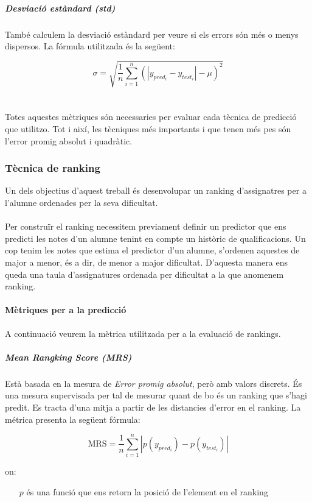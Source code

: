 \documentclass[12pt,a4paper,catalan]{article}
\begin{document}
\subparagraph{Desviació estàndard (std)}
També calculem la desviació estàndard per veure si els errors són més o menys dispersos. La fórmula utilitzada és la següent:

$$ \sigma = \sqrt{ \frac{1}{n} \sum_{i=1}^n (\left| y_{pred_i}-y_{test_i}\right| - \mu)^2 } $$
\\
\\
Totes aquestes mètriques són necessaries per evaluar cada tècnica de predicció que utilitzo. Tot i així, les tècniques més importants i que tenen més pes són l'error promig absolut i quadràtic.

\subsubsection{Tècnica de ranking}
Un dels objectius d'aquest treball és desenvolupar un ranking d'assignatres per a l'alumne ordenades per la seva dificultat. 
\\
\\
Per construïr el ranking necessitem previament definir un predictor que ens predicti les notes d'un alumne tenint en compte un històric de qualificacions. Un cop tenim les notes que estima el predictor d'un alumne, s'ordenen aquestes de major a menor, és a dir, de menor a major dificultat. D'aquesta manera ens queda una taula d'assignatures ordenada per dificultat a la que anomenem ranking.

\paragraph{Mètriques per a la predicció}
A continuació veurem la mètrica utilitzada per a la evaluació de rankings.

\subparagraph{\textit{Mean Rangking Score (MRS)}}
\label{subpar:mrs}
Està basada en la mesura de \textit{Error promig absolut}, però amb valors discrets. És una mesura supervisada per tal de mesurar quant de bo és un ranking que s'hagi predit. Es tracta d'una mitja a partir de les distancies d'error en el ranking. La métrica presenta la següent fórmula:

$$ \mathrm{MRS} = \frac{1}{n}\sum_{i=1}^n \left| p(y_{pred_i}) -  p(y_{test_i})\right| $$

on:
\begin{itemize}[leftmargin=.5in]
	\item [$p$] és una funció que ens retorn la posició de l'element en el ranking
\end{itemize}
\end{document}
